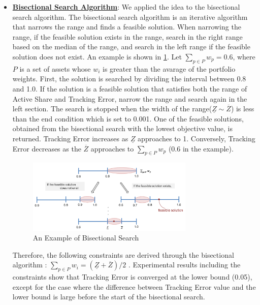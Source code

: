 \documentclass[11pt]{article}
\begin{document}
\begin{itemize}
	\item[] \underline{\textbf{Bisectional Search Algorithm}}:
	 We applied the idea to the bisectional search algorithm. The bisectional search algorithm is an iterative algorithm that narrows the range and finds a feasible solution. When narrowing the range, if the feasible solution exists in the range, search in the right range based on the median of the range, and search in the left range if the feasible solution does not exist.	
	An example is shown in \ref{fig:bisection}. Let  $ \sum_{p\in P} w_p = 0.6$, where $P$ is a set of assets whose $w_i$ is greater than the avarage of the portfolio weights. First, the solution is searched by dividing the interval between 0.8 and 1.0. If the solution is a feasible solution that satisfies both the range of Active Share and Tracking Error, narrow the range and search again in the left section. The search is stopped when the width of the range($\underline{Z} \sim \overline{Z}$) is less than the end condition which is set to 0.001. One of the feasible solutions, obtained from the bisectional search with the lowest objective value, is returned. Tracking Error increases as $\underline{Z}$ approaches to 1. Conversely, Tracking Error decreases as the $\overline{Z}$ approaches to $\sum_{p\in P}w_p$ (0.6 in the example). 
	\begin{figure}[h] 
		\begin{center}
			\includegraphics[width=0.75\textwidth]{bisection}
			\caption{An Example of Bisectional Search} \label{fig:bisection}
		\end{center}
	\end{figure}
	Therefore, the following constraints are derived through the bisectional algorithm : $\sum_{p \in P} w_i = (\underline{Z} +\overline{Z})/2 $ . Experimental results including the constraints show that Tracking Error is converged at the lower bound (0.05), except for the case where the difference between Tracking Error value and the lower bound is large before the start of the bisectional search.
	
	

\end{itemize}
\end{document}
